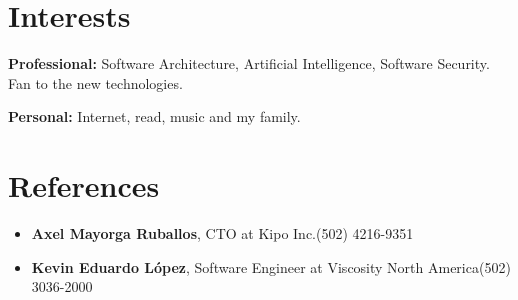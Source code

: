 \documentclass[]{friggeri-cv} %
\begin{document}



\section{Interests}

\textbf{Professional:} Software Architecture, Artificial Intelligence, Software Security. Fan to the new technologies. 

\textbf{Personal:} Internet, read, music and my family.

\section{References}

\begin{itemize}
	\item \noindent \textbf{Axel Mayorga Ruballos}, CTO at Kipo Inc.\hfill \hfill (502) 4216-9351
	\item \noindent \textbf{Kevin Eduardo López}, Software Engineer at Viscosity North America\hfill \hfill (502) 3036-2000
\end{itemize}
\end{document}
